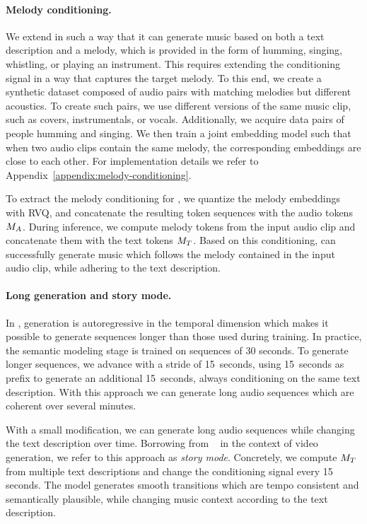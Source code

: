 \paragraph{Melody conditioning.}
\label{melody-conditioning}
We extend {\model} in such a way that it can generate music based on both a text description and a melody, which is provided in the form of humming, singing, whistling, or playing an instrument. 
This requires extending the conditioning signal in a way that captures the target melody. To this end, we create a synthetic dataset composed of audio pairs with matching melodies but different acoustics. To create such pairs, we use different versions of the same music clip, such as covers, instrumentals, or vocals. Additionally, we acquire data pairs of people humming and singing. %
We then train a joint embedding model such that when two audio clips contain the same melody, the corresponding embeddings are close to each other. For implementation details we refer to Appendix~\ref{appendix:melody-conditioning}. 

To extract the melody conditioning for {\model}, we quantize the melody embeddings with RVQ, and concatenate the resulting token sequences with the {\mulan} audio tokens $M_A$.
During inference, we compute melody tokens from the input audio clip and concatenate them with the {\mulan} text tokens $M_T$.
Based on this conditioning, {\model} can successfully generate music which follows the melody contained in the input audio clip, while adhering to the text description.

\paragraph{Long generation and story mode.}
\label{story-mode}
In {\model}, generation is autoregressive in the temporal dimension which makes it possible to generate sequences longer than those used during training. In practice, the semantic modeling stage is trained on sequences of 30 seconds. To generate longer sequences, we advance with a stride of 15~seconds, using 15~seconds as prefix to generate an additional 15~seconds, always conditioning on the same text description. With this approach we can generate long audio sequences which are coherent over several minutes.

With a small modification, we can generate long audio sequences while changing the text description over time. Borrowing from ~\citet{phenaki} in the context of video generation, we refer to this approach as \emph{story mode}. Concretely, we compute $M_T$ from multiple text descriptions and change the conditioning signal every 15 seconds. The model generates smooth transitions which are tempo consistent and semantically plausible, while changing music context according to the text description.
